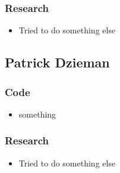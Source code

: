 \documentclass[10pt,a4paper]{article}
\begin{document}
\subsubsection*{Research}
\begin{itemize}
\item Tried to do something else

\end{itemize}

\subsection*{Patrick Dzieman}

\subsubsection*{Code}
\begin{itemize}
\item something

\end{itemize}
\subsubsection*{Research}
\begin{itemize}
\item Tried to do something else

\end{itemize}
\end{document}
